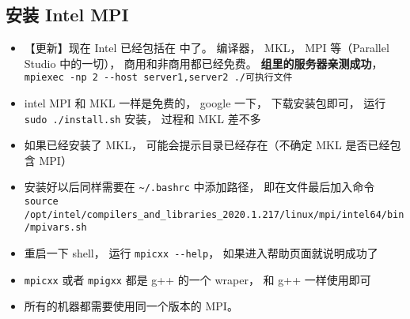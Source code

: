 \subsection{安装 Intel MPI}
\begin{itemize}
\item 【更新】现在 Intel 已经包括在  中了。 编译器， MKL， MPI 等（Parallel Studio 中的一切）， 商用和非商用都已经免费。 \textbf{组里的服务器亲测成功}， \verb|mpiexec -np 2 --host server1,server2 ./可执行文件|
\item intel MPI 和 MKL 一样是免费的， google 一下， 下载安装包即可， 运行 \verb`sudo ./install.sh` 安装， 过程和 MKL 差不多
\item 如果已经安装了 MKL， 可能会提示目录已经存在（不确定 MKL 是否已经包含 MPI）
\item 安装好以后同样需要在 \verb`~/.bashrc` 中添加路径， 即在文件最后加入命令 \verb`source /opt/intel/compilers_and_libraries_2020.1.217/linux/mpi/intel64/bin/mpivars.sh`
\item 重启一下 shell， 运行 \verb`mpicxx --help`， 如果进入帮助页面就说明成功了
\item \verb`mpicxx` 或者 \verb`mpigxx` 都是 g++ 的一个 wraper， 和 g++ 一样使用即可
\item 所有的机器都需要使用同一个版本的 MPI。
\end{itemize}


